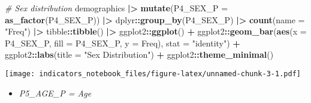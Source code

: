 \documentclass[
]{article}
\newenvironment{Shaded}{\begin{snugshade}}{\end{snugshade}}
\newcommand{\AttributeTok}[1]{\textcolor[rgb]{0.13,0.29,0.53}{#1}}
\newcommand{\CommentTok}[1]{\textcolor[rgb]{0.56,0.35,0.01}{\textit{#1}}}
\newcommand{\FunctionTok}[1]{\textcolor[rgb]{0.13,0.29,0.53}{\textbf{#1}}}
\newcommand{\NormalTok}[1]{#1}
\newcommand{\SpecialCharTok}[1]{\textcolor[rgb]{0.81,0.36,0.00}{\textbf{#1}}}
\newcommand{\StringTok}[1]{\textcolor[rgb]{0.31,0.60,0.02}{#1}}
\providecommand{\tightlist}{%
  \setlength{\itemsep}{0pt}\setlength{\parskip}{0pt}}
\begin{document}
\begin{Shaded}
\begin{Highlighting}[]
\CommentTok{\# Sex distribution}
\NormalTok{demographics }\SpecialCharTok{|\textgreater{}}
  \FunctionTok{mutate}\NormalTok{(}\AttributeTok{P4\_SEX\_P =} \FunctionTok{as\_factor}\NormalTok{(P4\_SEX\_P)) }\SpecialCharTok{|\textgreater{}}
\NormalTok{  dplyr}\SpecialCharTok{::}\FunctionTok{group\_by}\NormalTok{(P4\_SEX\_P) }\SpecialCharTok{|\textgreater{}}
  \FunctionTok{count}\NormalTok{(}\AttributeTok{name =} \StringTok{"Freq"}\NormalTok{) }\SpecialCharTok{|\textgreater{}}
\NormalTok{  tibble}\SpecialCharTok{::}\FunctionTok{tibble}\NormalTok{() }\SpecialCharTok{|\textgreater{}}
\NormalTok{  ggplot2}\SpecialCharTok{::}\FunctionTok{ggplot}\NormalTok{() }\SpecialCharTok{+}
\NormalTok{  ggplot2}\SpecialCharTok{::}\FunctionTok{geom\_bar}\NormalTok{(}\FunctionTok{aes}\NormalTok{(}\AttributeTok{x =}\NormalTok{ P4\_SEX\_P, }\AttributeTok{fill =}\NormalTok{ P4\_SEX\_P, }\AttributeTok{y =}\NormalTok{ Freq), }
                    \AttributeTok{stat =} \StringTok{"identity"}\NormalTok{) }\SpecialCharTok{+}
\NormalTok{  ggplot2}\SpecialCharTok{::}\FunctionTok{labs}\NormalTok{(}\AttributeTok{title =} \StringTok{"Sex Distribution"}\NormalTok{) }\SpecialCharTok{+}
\NormalTok{  ggplot2}\SpecialCharTok{::}\FunctionTok{theme\_minimal}\NormalTok{()}
\end{Highlighting}
\end{Shaded}

\texttt{[image: indicators\_notebook\_files/figure-latex/unnamed-chunk-3-1.pdf]}

\begin{itemize}
\tightlist
\item
  \emph{P5\_AGE\_P = Age}
\end{itemize}

\begin{Shaded}
\end{Shaded}
\end{document}
